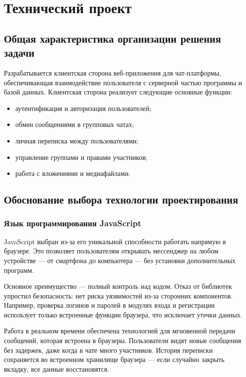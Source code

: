 \section{Технический проект}
\subsection{Общая характеристика организации решения задачи}

Разрабатывается клиентская сторона веб-приложения для чат-платформы, обеспечивающая взаимодействие пользователя с серверной частью программы и базой данных. Клиентская сторона реализует следующие основные функции:
\begin{itemize}
	\item аутентификация и авторизация пользователей;
	\item обмен сообщениями в групповых чатах;
	\item личная переписка между пользователями;
	\item управление группами и правами участников;
	\item работа с вложениями и медиафайлами.
\end{itemize}

\subsection{Обоснование выбора технологии проектирования}  
\subsubsection{Язык программирования JavaScript}  

JavaScript выбран из-за его уникальной способности работать напрямую в браузере. Это позволяет пользователям открывать мессенджер на любом устройстве — от смартфона до компьютера — без установки дополнительных программ.  

Основное преимущество — полный контроль над кодом. Отказ от библиотек упростил безопасность: нет риска уязвимостей из-за сторонних компонентов. Например, проверка логинов и паролей в модулях входа и регистрации использует только встроенные функции браузера, что исключает утечки данных.  

Работа в реальном времени обеспечена технологией для мгновенной передачи сообщений, которая встроена в браузеры. Пользователи видят новые сообщения без задержек, даже когда в чате много участников. История переписки сохраняется во встроенном хранилище браузера — если случайно закрыть вкладку, все данные восстановятся.  

